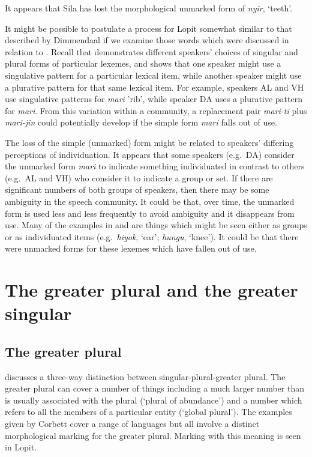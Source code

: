 \documentclass[output=paper]{langsci/langscibook}
\begin{document}
It appears that Sila has lost the morphological unmarked form of \textit{nyir}, ‘teeth’. 

It might be possible to postulate a process for Lopit somewhat similar to that described by Dimmendaal if we examine those words which were discussed in relation to . Recall that  demonstrates different speakers’ choices of singular and plural forms of particular lexemes, and shows that one speaker might use a singulative pattern for a particular lexical item, while another speaker might use a plurative pattern for that same lexical item. For example, speakers AL and VH use singulative patterns for \textit{mari} 'rib', while speaker DA uses a plurative pattern for \textit{mari}. From this variation within a community, a replacement pair \textit{mari-ti} plus \textit{mari-jin} could potentially develop if the simple form \textit{mari} falls out of use. 

The loss of the simple (unmarked) form might be related to speakers’ differing perceptions of individuation. It appears that some speakers (e.g.\ DA) consider the unmarked form \textit{mari }to indicate something individuated in contrast to others (e.g.\ AL and VH) who consider it to indicate a group or set. If there are significant numbers of both groups of speakers, then there may be some ambiguity in the speech community. It could be that, over time, the unmarked form is used less and less frequently to avoid ambiguity and it disappears from use. Many of the examples in  and  are things which might be seen either as groups or as individuated items (e.g.\ \textit{hiyok}, ‘ear’; \textit{hungu}, ‘knee’). It could be that there were unmarked forms for these lexemes which have fallen out of use.

\section{The greater plural and the greater singular} \label{sec:moodie:5}


\subsection{The greater plural} \label{sec:moodie:5.1}

\citet[30]{Corbett2000} discusses a three-way distinction between singular-plural-greater plural. The greater plural can cover a number of things including a much larger number than is usually associated with the plural (‘plural of abundance’) and a number which refers to all the members of a particular entity (‘global plural’). The examples given by Corbett cover a range of languages but all involve a distinct morphological marking for the greater plural. Marking with this meaning is seen in Lopit. 
\end{document}
